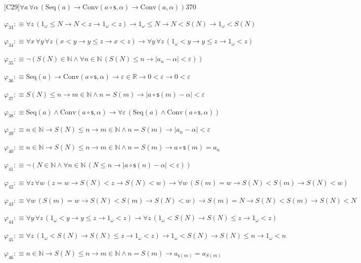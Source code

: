 \begin{fullproof}{[C29]}{$\forall a\,\forall \alpha\,(\mathrm{Seq}(a) \to \mathrm{Conv}(a \circ \mathsf{s},\alpha) \to \mathrm{Conv}(a,\alpha))$}{370}
\begin{abbrevlist}
\item $\varphi_{33} :\equiv \forall z\,(1_{\omega} \leq N \to N < z \to 1_{\omega} < z) \to 1_{\omega} \leq N \to N < S(N) \to 1_{\omega} < S(N)$
\item $\varphi_{34} :\equiv \forall x\,\forall y\,\forall z\,(x < y \to y \leq z \to x < z) \to \forall y\,\forall z\,(1_{\omega} < y \to y \leq z \to 1_{\omega} < z)$
\item $\varphi_{35} :\equiv \neg (S(N) \in \mathbb{N} \land \forall n \in \mathbb{N}\,(S(N) \leq n \to \lvert a_{n} - \alpha \rvert < \varepsilon))$
\item $\varphi_{36} :\equiv \mathrm{Seq}(a) \to \mathrm{Conv}(a \circ \mathsf{s},\alpha) \to \varepsilon \in \mathbb{R} \to 0 < \varepsilon \to 0 < \varepsilon$
\item $\varphi_{37} :\equiv S(N) \leq n \to m \in \mathbb{N} \land n = S(m) \to \lvert a \circ \mathsf{s}(m) - \alpha \rvert < \varepsilon$
\item $\varphi_{38} :\equiv \mathrm{Seq}(a) \land \mathrm{Conv}(a \circ \mathsf{s},\alpha) \to \forall \varepsilon\,(\mathrm{Seq}(a) \land \mathrm{Conv}(a \circ \mathsf{s},\alpha))$
\item $\varphi_{39} :\equiv n \in \mathbb{N} \to S(N) \leq n \to m \in \mathbb{N} \land n = S(m) \to \lvert a_{n} - \alpha \rvert < \varepsilon$
\item $\varphi_{40} :\equiv n \in \mathbb{N} \to S(N) \leq n \to m \in \mathbb{N} \land n = S(m) \to a \circ \mathsf{s}(m) = a_{n}$
\item $\varphi_{41} :\equiv \neg (N \in \mathbb{N} \land \forall n \in \mathbb{N}\,(N \leq n \to \lvert a \circ \mathsf{s}(n) - \alpha \rvert < \varepsilon))$
\item $\varphi_{42} :\equiv \forall z\,\forall w\,(z = w \to S(N) < z \to S(N) < w) \to \forall w\,(S(m) = w \to S(N) < S(m) \to S(N) < w)$
\item $\varphi_{43} :\equiv \forall w\,(S(m) = w \to S(N) < S(m) \to S(N) < w) \to S(m) = N \to S(N) < S(m) \to S(N) < N$
\item $\varphi_{44} :\equiv \forall y\,\forall z\,(1_{\omega} < y \to y \leq z \to 1_{\omega} < z) \to \forall z\,(1_{\omega} < S(N) \to S(N) \leq z \to 1_{\omega} < z)$
\item $\varphi_{45} :\equiv \forall z\,(1_{\omega} < S(N) \to S(N) \leq z \to 1_{\omega} < z) \to 1_{\omega} < S(N) \to S(N) \leq n \to 1_{\omega} < n$
\item $\varphi_{46} :\equiv n \in \mathbb{N} \to S(N) \leq n \to m \in \mathbb{N} \land n = S(m) \to a_{\mathsf{s}(m)} = a_{S(m)}$

\end{abbrevlist}
\end{fullproof}
